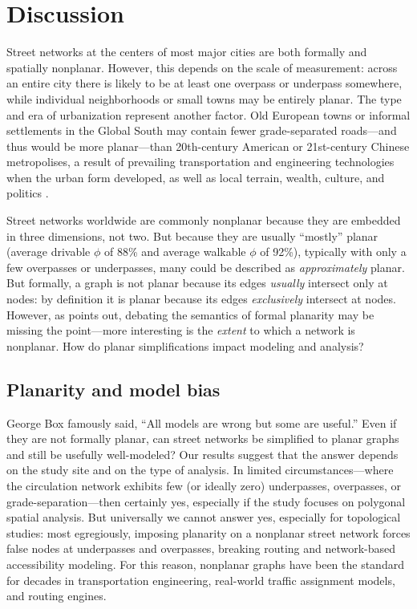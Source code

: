 \documentclass[Afour,doublespace,sageh,times]{sagej}
\begin{document}
\section{Discussion}

Street networks at the centers of most major cities are both formally and spatially nonplanar. However, this depends on the scale of measurement: across an entire city there is likely to be at least one overpass or underpass somewhere, while individual neighborhoods or small towns may be entirely planar. The type and era of urbanization represent another factor. Old European towns or informal settlements in the Global South may contain fewer grade-separated roads---and thus would be more planar---than 20th-century American or 21st-century Chinese metropolises, a result of prevailing transportation and engineering technologies when the urban form developed, as well as local terrain, wealth, culture, and politics \citep{southworth_street_1995}.

Street networks worldwide are commonly nonplanar because they are embedded in three dimensions, not two. But because they are usually \enquote{mostly} planar (average drivable $\phi$ of 88\% and average walkable $\phi$ of 92\%), typically with only a few overpasses or underpasses, many could be described as \emph{approximately} planar. But formally, a graph is not planar because its edges \emph{usually} intersect only at nodes: by definition it is planar because its edges \emph{exclusively} intersect at nodes. However, as \citet{newman_networks:_2010} points out, debating the semantics of formal planarity may be missing the point---more interesting is the \emph{extent} to which a network is nonplanar. How do planar simplifications impact modeling and analysis?

\subsection{Planarity and model bias}

George Box famously said, \enquote{All models are wrong but some are useful.} Even if they are not formally planar, can street networks be simplified to planar graphs and still be usefully well-modeled? Our results suggest that the answer depends on the study site and on the type of analysis. In limited circumstances---where the circulation network exhibits few (or ideally zero) underpasses, overpasses, or grade-separation---then certainly yes, especially if the study focuses on polygonal spatial analysis. But universally we cannot answer yes, especially for topological studies: most egregiously, imposing planarity on a nonplanar street network forces false nodes at underpasses and overpasses, breaking routing and network-based accessibility modeling. For this reason, nonplanar graphs have been the standard for decades in transportation engineering, real-world traffic assignment models, and routing engines.
\end{document}
